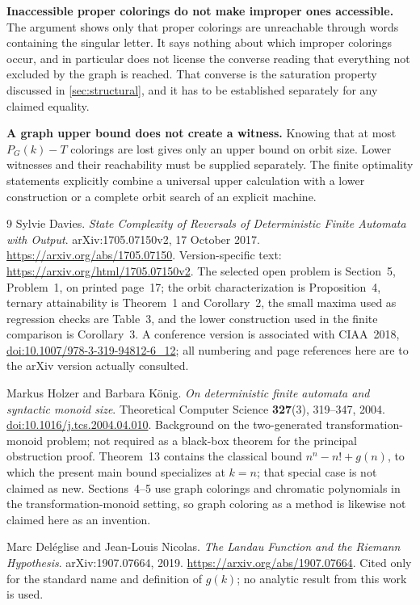 \documentclass[11pt,a4paper]{article}
\numberwithin{equation}{section}
\theoremstyle{definition}
\theoremstyle{remark}
\begin{document}
\textbf{Inaccessible proper colorings do not make improper ones accessible.}
The argument shows only that proper colorings are unreachable through words
containing the singular letter. It says nothing about which improper
colorings occur, and in particular does not license the converse reading that
everything not excluded by the graph is reached. That converse is the
saturation property discussed in \cref{sec:structural}, and it has to be
established separately for any claimed equality.

\textbf{A graph upper bound does not create a witness.} Knowing that at most
$P_G(k)-T$ colorings are lost gives only an upper bound on orbit size. Lower
witnesses and their reachability must be supplied separately. The finite
optimality statements explicitly combine a universal upper calculation with
a lower construction or a complete orbit search of an explicit machine.

\begin{thebibliography}{9}
Sylvie Davies.
\emph{State Complexity of Reversals of Deterministic Finite Automata with
Output}.
arXiv:1705.07150v2, 17 October 2017.
\url{https://arxiv.org/abs/1705.07150}.
Version-specific text: \url{https://arxiv.org/html/1705.07150v2}.
The selected open problem is Section~5, Problem~1, on printed page~17; the
orbit characterization is Proposition~4, ternary attainability is Theorem~1
and Corollary~2, the small maxima used as regression checks are Table~3, and
the lower construction used in the finite comparison is Corollary~3.
A conference version is associated with CIAA~2018,
\href{https://doi.org/10.1007/978-3-319-94812-6_12}%
{doi:10.1007/978-3-319-94812-6\_12}; all numbering and page references here
are to the arXiv version actually consulted.

Markus Holzer and Barbara K\"onig.
\emph{On deterministic finite automata and syntactic monoid size}.
Theoretical Computer Science \textbf{327}(3), 319--347, 2004.
\href{https://doi.org/10.1016/j.tcs.2004.04.010}{doi:10.1016/j.tcs.2004.04.010}.
Background on the two-generated transformation-monoid problem; not required
as a black-box theorem for the principal obstruction proof. Theorem~13
contains the classical bound $n^n-n!+g(n)$, to which the present main bound
specializes at $k=n$; that special case is not claimed as new. Sections~4--5
use graph colorings and chromatic polynomials in the transformation-monoid
setting, so graph coloring as a method is likewise not claimed here as an
invention.

Marc Del\'eglise and Jean-Louis Nicolas.
\emph{The Landau Function and the Riemann Hypothesis}.
arXiv:1907.07664, 2019.
\url{https://arxiv.org/abs/1907.07664}.
Cited only for the standard name and definition of $g(k)$; no analytic
result from this work is used.
\end{thebibliography}
\end{document}
